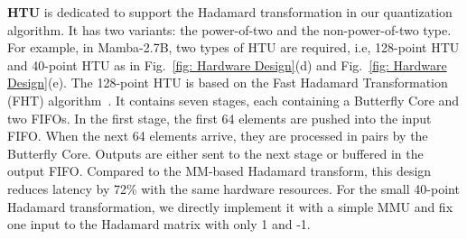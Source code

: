 \textbf{HTU}
is dedicated to support the Hadamard transformation in our quantization algorithm. 
It has two variants: the power-of-two and the non-power-of-two type. 
For example, in Mamba-2.7B,  two types of HTU are required,
i.e, 128-point HTU and 40-point HTU as in Fig.~\ref{fig: Hardware Design}(d) and Fig.~\ref{fig: Hardware Design}(e).
The 128-point HTU is based on the Fast Hadamard Transformation (FHT) algorithm~\cite{FHT}.
It contains seven stages, each containing a Butterfly Core and two FIFOs.
In the first stage, the first 64 elements are pushed into the input FIFO.
When the next 64 elements arrive, they are processed in pairs by the Butterfly Core. 
Outputs are either sent to the next stage or buffered in the output FIFO. 
Compared to the MM-based Hadamard transform, this design reduces latency by 72\% with the same hardware resources.
For the small 40-point Hadamard transformation, we directly implement it with a simple MMU and fix one input to the Hadamard matrix with only 1 and -1.



